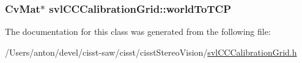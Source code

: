 \subsubsection[{world\+To\+T\+C\+P}]{\setlength{\rightskip}{0pt plus 5cm}Cv\+Mat$\ast$ svl\+C\+C\+Calibration\+Grid\+::world\+To\+T\+C\+P}\label{classsvl_c_c_calibration_grid_a76795dc4a6916d8c4cc6c2eec54bf049}


The documentation for this class was generated from the following file\+:\begin{DoxyCompactItemize}
\item 
/\+Users/anton/devel/cisst-\/saw/cisst/cisst\+Stereo\+Vision/\hyperlink{svl_c_c_calibration_grid_8h}{svl\+C\+C\+Calibration\+Grid.\+h}\end{DoxyCompactItemize}
